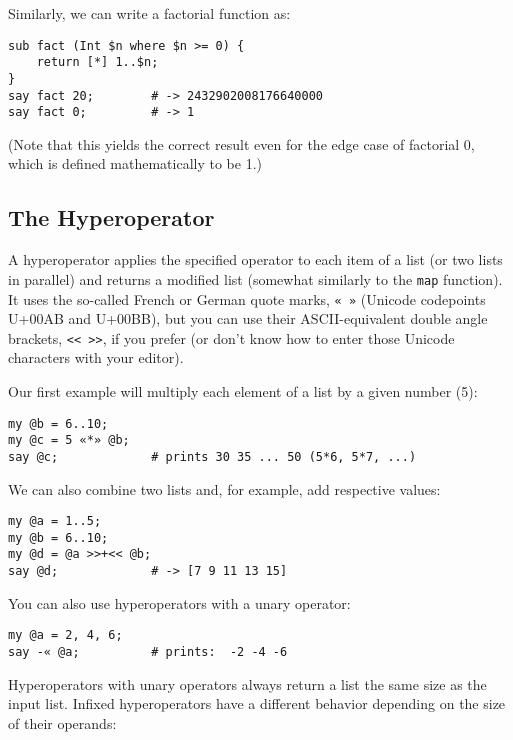 Similarly, we can write a factorial function as:

\begin{verbatim}
sub fact (Int $n where $n >= 0) {
    return [*] 1..$n;
}
say fact 20;        # -> 2432902008176640000
say fact 0;         # -> 1
\end{verbatim}

(Note that this yields the correct result even for the 
edge case of factorial 0, which is defined mathematically 
to be 1.)

\subsection{The Hyperoperator}

A hyperoperator applies the specified operator to each 
item of a list (or two lists in parallel) and returns a 
modified list (somewhat similarly to the {\tt map} 
function). It uses the so-called French or German 
quote marks, \verb'« »' (Unicode codepoints U+00AB 
and U+00BB), but you can use their ASCII-equivalent 
double angle brackets, \verb'<< >>', if you prefer 
(or don't know how to enter those Unicode characters 
with your editor).

Our first example will multiply each element of a list 
by a given number (5):

\begin{verbatim}
my @b = 6..10;
my @c = 5 «*» @b;
say @c;             # prints 30 35 ... 50 (5*6, 5*7, ...)
\end{verbatim}

We can also combine two lists and, for example, add 
respective values:

\begin{verbatim}
my @a = 1..5;
my @b = 6..10;
my @d = @a >>+<< @b;
say @d;             # -> [7 9 11 13 15]
\end{verbatim}

You can also use hyperoperators with a unary operator:

\begin{verbatim}
my @a = 2, 4, 6;
say -« @a;          # prints:  -2 -4 -6
\end{verbatim}

Hyperoperators with unary operators always return a 
list the same size as the input list. Infixed 
hyperoperators have a different behavior depending on 
the size of their operands:


